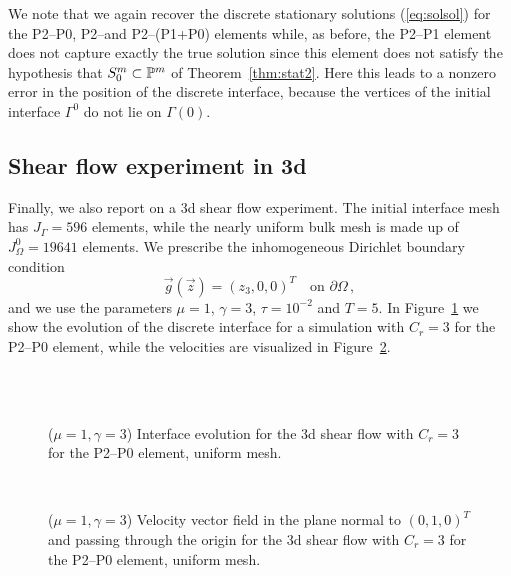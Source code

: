 We note that we again recover the discrete stationary solutions
(\ref{eq:solsol}) for the P2--P0, P2--\pdg and P2--(P1+P0) elements while,
as before, the P2--P1 element does not capture exactly the true solution
since this element does not satisfy the hypothesis that $S^m_0 \subset
\mathbb{P}^m$ of Theorem~\ref{thm:stat2}. Here this leads to a nonzero error in
the position of the discrete interface, because the vertices of the initial
interface $\Gamma^0$ do not lie on $\Gamma(0)$.

\subsection{Shear flow experiment in 3d}
Finally, we also report on a 3d shear flow experiment.
The initial interface mesh has $J_\Gamma = 596$ elements, while the nearly
uniform bulk mesh is made up of $J_\Omega^0 = 19641$ elements. We prescribe the
inhomogeneous Dirichlet boundary condition
\begin{equation*}
\vec g(\vec z)=(z_3,0,0)^T\quad \mbox{on }\partial\Omega\,,
\end{equation*}
and we use the parameters $\mu=1$, $\gamma=3$, $\tau=10^{-2}$ and $T=5$.
In Figure~\ref{fig:shear_3d} we show the evolution of the discrete interface
for a simulation with $C_r=3$ for the P2--P0 element, while the velocities
are visualized in Figure~\ref{fig:shear_3d_velocity}.
\begin{figure}[htbp]
\centering
{}\\
\\
\caption[Stokes 3d shear flow interface]
{($\mu=1,\gamma=3$) Interface evolution for the 3d shear flow with $C_r=3$ for
the P2--P0 element, uniform mesh.}
\label{fig:shear_3d}
\end{figure}
\begin{figure}[htbp]
\centering
{}
\\
\caption[Stokes 3d shear flow velocity]
{($\mu=1,\gamma=3$) Velocity vector field in the plane normal to $(0,1,0)^T$
and passing through the origin for the 3d shear flow with $C_r=3$ for the
P2--P0 element, uniform mesh.}
\label{fig:shear_3d_velocity}
\end{figure}

